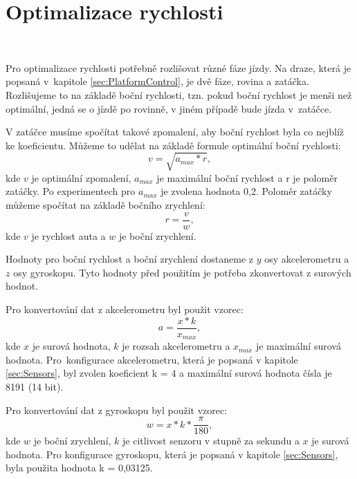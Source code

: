 \chapter{Optimalizace rychlosti}
\label{sec:SpeedOptimization}
\vspace{-20pt}
\

Pro optimalizace rychlosti potřebně rozlišovat různé fáze jízdy.
Na draze, která je popsaná v~kapitole \ref{sec:PlatformControl},
je dvě fáze, rovina a zatáčka. Rozlišujeme to na základě
boční rychlosti, tzn. pokud boční rychlost je menši než optimální, jedná se o 
jízdě po rovinně, v jiném případě bude jízda v~zatáčce.

V zatáčce musíme spočítat takové zpomalení, aby boční rychlost byla co nejblíž
ke koeficientu. Můžeme to udělat na základě formule optimální boční rychlosti:
\begin{equation}
v = \sqrt{a_{max} * r},
\end{equation}
kde $v$ je optimální zpomalení, $a_{max}$ je maximální boční rychlost a r je
poloměr zatáčky. Po experimentech pro $a_{max}$ je zvolena hodnota 0,2. Poloměr zatáčky můžeme spočítat na základě bočního zrychlení:
\begin{equation}
r = \frac{v}{w},
\end{equation}
kde $v$ je rychlost auta a $w$ je boční zrychlení.

Hodnoty pro boční rychlost a boční zrychlení dostaneme z $y$ osy akcelerometru
a $z$ osy gyroskopu. Tyto hodnoty před použitím je potřeba zkonvertovat z 
surových hodnot. 

Pro konvertování dat z akcelerometru byl použit vzorec:
\begin{equation}
a = \frac{x * k}{x_{max}},
\end{equation}
kde $x$ je surová hodnota, $k$ je rozsah akcelerometru a $x_{max}$ je maximální surová 
hodnota. Pro~konfigurace akcelerometru, která je popsaná v kapitole \ref{sec:Sensors},
byl zvolen koeficient k = 4 a maximální surová hodnota čísla je 8191 (14 bit).

Pro konvertování dat z gyroskopu byl použit vzorec:
\begin{equation}
w = x * k * \frac{\pi}{180},
\end{equation} 
kde $w$ je boční zrychlení, $k$ je citlivost senzoru v stupně za sekundu a $x$
je surová hodnota. Pro konfigurace gyroskopu, která je popsaná 
v kapitole \ref{sec:Sensors}, byla použita hodnota  k = 0,03125.

\endinput
